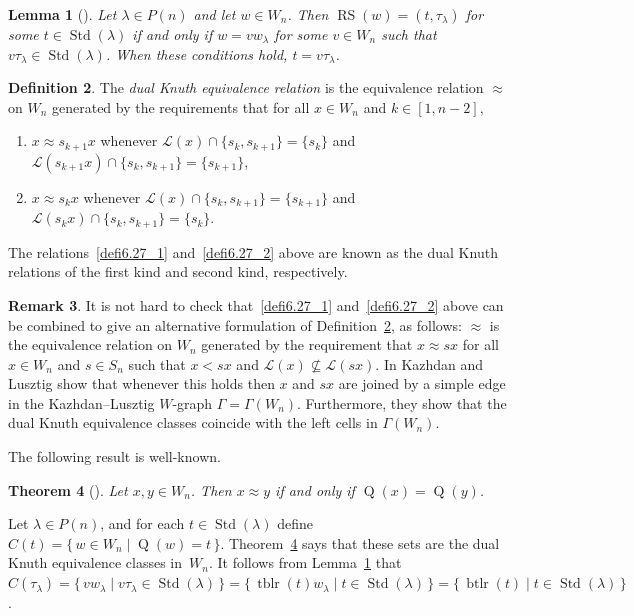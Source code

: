 \documentclass[10pt]{amsart}
\newtheorem{theo}{Theorem}[section]
\newtheorem{lemm}[theo]{Lemma}
\theoremstyle{definition}
\newtheorem{defi}[theo]{Definition}
\newtheorem{rema}[theo]{Remark}
\DeclareMathOperator{\perm}{tblr}
\DeclareMathOperator{\word}{btlr}
\newcommand{\citex}[2]{\cite[#1]{#2}}
\DeclareMathOperator{\STD}{Std}
\DeclareMathOperator{\RS}{RS}
\DeclareMathOperator{\RSQ}{Q}
\begin{document}
\begin{lemm}[{\citex{Lemma~6.3}{nguyen:wgideals2}}]\label{rstlambda}
Let $\lambda\in P(n)$ and let $w\in W_n$. Then
$\RS(w)=(t,\tau_\lambda)$ for some $t\in\STD(\lambda)$ if and
only if $w=vw_{\lambda}$ for some $v\in W_n$ such that
$v\tau_\lambda\in\STD(\lambda)$. When these conditions hold,
$t=v\tau_\lambda$.
\end{lemm}

\begin{defi}\label{dualKnuthequivalencerelation}
The \emph{dual Knuth equivalence relation} is the equivalence relation $\approx$
on $W_n$ generated by the requirements that for all $x\in W_n$ and
$k \in [1,n-2]$,
\begin{enumerate}[label=(\arabic*),topsep=1 pt]
\item\label{defi6.27_1} $x\approx s_{k+1}x$ whenever $\mathcal{L}(x)\cap\{s_{k},s_{k+1}\}=\{s_{k}\}$
and $\mathcal{L}(s_{k+1}x)\cap\{s_k,s_{k+1}\}=\{s_{k+1}\}$,
\item\label{defi6.27_2} $x\approx s_kx$ whenever $\mathcal{L}(x)\cap\{s_{k},s_{k+1}\} = \{s_{k+1}\}$
and $\mathcal{L}(s_kx)\cap\{s_k,s_{k+1}\}=\{s_{k}\}$.
\end{enumerate}
\end{defi}
The relations~\ref{defi6.27_1} and~\ref{defi6.27_2} above are known as the dual Knuth relations of
the first kind and second kind, respectively.

\begin{rema}\label{altDualKnuth}
It is not hard to check that~\ref{defi6.27_1} and~\ref{defi6.27_2} above can be combined to give an
alternative formulation of Definition~\ref{dualKnuthequivalencerelation},
as follows: $\approx$ is the equivalence relation on $W_n$ generated by
the requirement that $x\approx sx$ for all $x\in W_n$ and $s\in S_n$
such that $x<sx$ and $\mathcal{L}(x)\nsubseteq\mathcal{L}(sx)$.
In \cite{kazlus:coxhecke} Kazhdan and Lusztig show that whenever this
holds then $x$ and $sx$ are joined by a simple
edge in the Kazhdan--Lusztig $W$-graph $\Gamma=\Gamma(W_n)$. Furthermore,
they show that the dual Knuth equivalence classes coincide with the
left cells in $\Gamma(W_n)$.
\end{rema}
The following result is well-known.

\begin{theo}[{\citex{Theorem~3.6.10}{sag:sym}}]\label{knuth}
Let $x,y \in W_n$. Then $x\approx y$ if and only if $\RSQ(x)=\RSQ(y)$.
\end{theo}
Let $\lambda\in P(n)$, and for each $t\in\STD(\lambda)$
define $C(t)=\{\,w\in W_n \mid \RSQ(w)=t\,\}$. Theorem~\ref{knuth} says
that these sets are the dual Knuth equivalence classes in~$W_n$. It follows
from Lemma~\ref{rstlambda} that
$C(\tau_\lambda)=\{\,vw_{\lambda} \mid v\tau_\lambda\in\STD(\lambda)\,\}
=\{\,\perm(t)w_{\lambda}\mid t\in\STD(\lambda)\,\}
=\{\,\word(t)\mid t\in\STD(\lambda)\,\}$.
\end{document}

